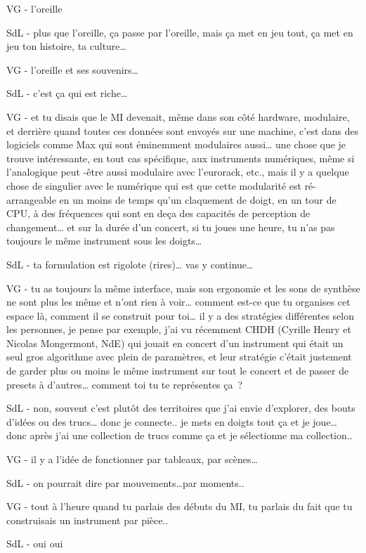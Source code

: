 VG - l'oreille 

SdL - plus que l'oreille, ça passe par l'oreille, mais ça met en jeu tout, ça met en jeu ton histoire, ta culture… 

VG - l'oreille et ses souvenirs… 

SdL - c'est ça qui est riche… 

VG - et tu disais que le MI devenait, même dans son côté hardware, modulaire, et derrière quand toutes ces données sont envoyés sur une machine, c'est dans des logiciels comme Max qui sont éminemment modulaires aussi… une chose que je trouve intéressante, en tout cas spécifique, aux instruments numériques, même si l'analogique peut -être aussi modulaire avec l'eurorack, etc., mais il y a quelque chose de singulier avec le numérique qui est que cette modularité est ré-arrangeable en un moins de temps qu'un claquement de doigt, en un tour de CPU, à des fréquences qui sont en deça des capacités de perception de changement… et sur la durée d'un concert, si tu joues une heure, tu n'as pas toujours le même instrument sous les doigts… 

SdL - ta formulation est rigolote (rires)… vas y continue… 

VG - tu as toujours la même interface, mais son ergonomie et les sons de synthèse ne sont plus les même et n'ont rien à voir… comment est-ce que tu organises cet espace là, comment il se construit pour toi… il y a des stratégies différentes selon les personnes, je pense par exemple, j'ai vu récemment CHDH (Cyrille Henry et Nicolas Mongermont, NdE) qui jouait en concert d'un instrument qui était un seul gros algorithme avec plein de paramètres, et leur stratégie c'était justement de garder plus ou moins le même instrument sur tout le concert et de passer de presets à d'autres… comment toi tu te représentes ça ? 

SdL - non, souvent c'est plutôt des territoires que j'ai envie d'explorer, des bouts d'idées ou des trucs… donc je connecte.. je mets en doigts tout ça et je joue… donc après j'ai une collection de trucs comme ça et je sélectionne ma collection..  

VG - il y a l'idée de fonctionner par tableaux, par scènes… 

SdL - on pourrait dire par mouvements…par moments.. 

VG - tout à l'heure quand tu parlais des débuts du MI, tu parlais du fait que tu construisais un instrument par pièce.. 

SdL - oui oui 

